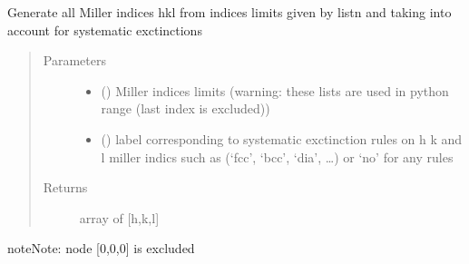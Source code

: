 \documentclass[letterpaper,10pt,english]{sphinxmanual}
\begin{document}
\begin{fulllineitems}
\label{\detokenize{Simulation_Module:LaueTools.lauecore.genHKL_np}}
Generate all Miller indices hkl from indices limits given  by listn
and taking into account for systematic exctinctions
\begin{quote}\begin{description}
\item[{Parameters}] \leavevmode\begin{itemize}
\item {} 
 (\sphinxstyleliteralemphasis{\sphinxupquote{{[}}}\sphinxstyleliteralemphasis{\sphinxupquote{{[}}}\sphinxstyleliteralemphasis{\sphinxupquote{,}}\sphinxstyleliteralemphasis{\sphinxupquote{{]}}}\sphinxstyleliteralemphasis{\sphinxupquote{,}}\sphinxstyleliteralemphasis{\sphinxupquote{{[}}}\sphinxstyleliteralemphasis{\sphinxupquote{,}}\sphinxstyleliteralemphasis{\sphinxupquote{{]}}}\sphinxstyleliteralemphasis{\sphinxupquote{,}}\sphinxstyleliteralemphasis{\sphinxupquote{{[}}}\sphinxstyleliteralemphasis{\sphinxupquote{,}}\sphinxstyleliteralemphasis{\sphinxupquote{{]}}}\sphinxstyleliteralemphasis{\sphinxupquote{{]}}}) \textendash{} Miller indices limits (warning: these lists are used in python range (last index is excluded))

\item {} 
 () \textendash{} label corresponding to systematic exctinction
rules on h k and l miller indics such as (‘fcc’, ‘bcc’, ‘dia’, …) or ‘no’ for any rules

\end{itemize}

\item[{Returns}] \leavevmode
array of {[}h,k,l{]}

\end{description}\end{quote}

\begin{sphinxadmonition}{note}{Note:}
node {[}0,0,0{]} is excluded
\end{sphinxadmonition}

\end{fulllineitems}
\end{document}
